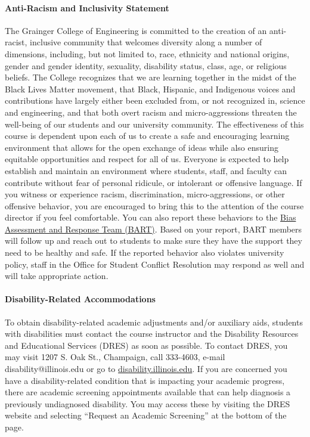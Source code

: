 \documentclass[11pt, a4paper]{article}
\begin{document}
\paragraph{Anti-Racism and Inclusivity Statement} The Grainger College of 
        Engineering is committed to the creation of an anti-racist, inclusive 
        community that welcomes diversity along a number of dimensions, 
        including, but not limited to, race, ethnicity and national origins, 
        gender and gender identity, sexuality, disability status, class, age, 
        or religious beliefs. The College recognizes that we are learning 
        together in the midst of the Black Lives Matter movement, that Black, 
        Hispanic, and Indigenous voices and contributions have largely either 
        been excluded from, or not recognized in, science and engineering, and 
        that both overt racism and micro-aggressions threaten the well-being of 
        our students and our university community.
        The effectiveness of this course is dependent upon each of us to create 
        a safe and encouraging learning environment that allows for the open 
        exchange of ideas while also ensuring equitable opportunities and 
        respect for all of us. Everyone is expected to help establish and 
        maintain an environment where students, staff, and faculty can 
        contribute without fear of personal ridicule, or intolerant or 
        offensive language. If you witness or experience racism, 
        discrimination, micro-aggressions, or other offensive behavior, you are 
        encouraged to bring this to the attention of the course director if you 
        feel comfortable. You can also report these behaviors to the 
        \href{https://bart.illinois.edu/}{Bias Assessment and Response Team 
        (BART)}.  Based on your report, BART members will follow up and reach 
        out to students to make sure they have the support they need to be 
        healthy and safe. If the reported behavior also violates university 
        policy, staff in the Office for Student Conflict Resolution may respond 
        as well and will take appropriate action.  

\paragraph{Disability-Related Accommodations}
To obtain disability-related academic adjustments and/or auxiliary aids, 
students with disabilities must contact the course instructor and the 
Disability Resources and Educational Services (DRES) as soon as possible. To 
contact DRES, you may visit 1207 S. Oak St., Champaign, call 333-4603, e-mail 
disability@illinois.edu or go to 
\href{https://www.disability.illinois.edu}{disability.illinois.edu}.  If you 
are concerned you have a disability-related condition that is impacting your 
academic progress, there are academic screening appointments available that can 
help diagnosis a previously undiagnosed disability. You may access these by 
visiting the DRES website and selecting ``Request an Academic Screening'' at the 
bottom of the page.
\end{document}
